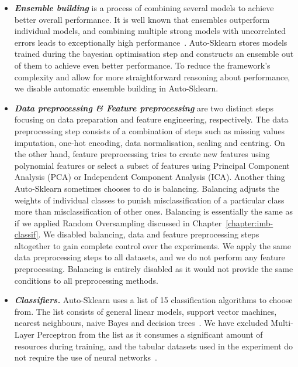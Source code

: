 \begin{itemize}
    \item \textbf{\emph{Ensemble building}} is a process of combining several models to achieve
        better overall performance. It is well known that ensembles outperform individual models,
        and combining multiple strong models with uncorrelated errors leads to exceptionally high
        performance~\cite{auto-sklearn-1.0}. Auto-Sklearn stores models trained during the bayesian
        optimisation step and constructs an ensemble out of them to achieve even better
        performance. To reduce the framework's complexity and allow for more straightforward
        reasoning about performance, we disable automatic ensemble building in Auto-Sklearn.

    \item \textbf{\emph{Data preprocessing \& Feature preprocessing}} are two distinct steps
        focusing on data preparation and feature engineering, respectively. The data preprocessing
        step consists of a combination of steps such as missing values imputation, one-hot
        encoding, data normalisation, scaling and centring. On the other hand, feature
        preprocessing tries to create new features using polynomial features or select a subset of
        features using Principal Component Analysis (PCA) or Independent Component Analysis (ICA).
        Another thing Auto-Sklearn sometimes chooses to do is balancing. Balancing adjusts the
        weights of individual classes to punish misclassification of a particular class more than
        misclassification of other ones. Balancing is essentially the same as if we applied Random
        Oversampling discussed in Chapter~\ref{chapter:imb-classif}. We disabled balancing, data
        and feature preprocessing steps altogether to gain complete control over the experiments.
        We apply the same data preprocessing steps to all datasets, and we do not perform any
        feature preprocessing. Balancing is entirely disabled as it would not provide the same
        conditions to all preprocessing methods.

    \item \textbf{\emph{Classifiers.}} Auto-Sklearn uses a list of 15 classification algorithms to
        choose from. The list consists of general linear models, support vector machines, nearest
        neighbours, naive Bayes and decision trees~\cite{auto-sklearn-1.0}. We have excluded
        Multi-Layer Perceptron from the list as it consumes a significant amount of resources
        during training, and the tabular datasets used in the experiment do not require the use of
        neural networks~\cite{nn-for-tabular-data}.

\end{itemize}


